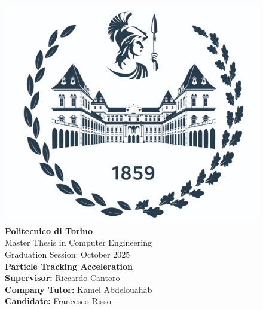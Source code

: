 
\newpage
\setcounter{page}{1}

\newcommand{\summaryintrosmallspace}{0.05cm}
\newcommand{\summaryintrobigspace}{0.3cm}

\begin{figure}
	\centering
	\includegraphics[width=\linewidth]{images/logo/logo_without_name.png}
	\endminipage\hfill
	\textbf{Politecnico di Torino} \vspace{\summaryintrosmallspace} \\
	Master Thesis in Computer Engineering \vspace{\summaryintrosmallspace} \\
	Graduation Session: October 2025 \vspace{\summaryintrobigspace} \\
	\textbf{Particle Tracking Acceleration} \vspace{\summaryintrobigspace} \\
	\textbf{Supervisor:} Riccardo Cantoro\vspace{\summaryintrosmallspace} \\
	\textbf{Company Tutor:} Kamel Abdelouahab \vspace{\summaryintrosmallspace} \\
	\textbf{Candidate:} Francesco Risso
	\endminipage
\end{figure}

